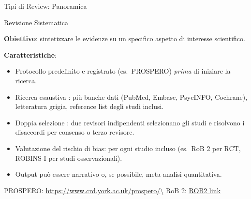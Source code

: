 \documentclass[
  ignorenonframetext,
]{beamer}
\begin{document}
\begin{frame}{Tipi di Review: Panoramica}
\label{tipi-di-review-panoramica}
\end{frame}

\begin{frame}{Revisione Sistematica}
\label{revisione-sistematica}
\small

\textbf{Obiettivo}: sintetizzare le evidenze su un specifico aspetto di
interesse scientifico.

\textbf{Caratteristiche}:

\begin{itemize}
\item
  Protocollo predefinito e registrato (es.~PROSPERO) \emph{prima} di
  iniziare la ricerca.
\item
  Ricerca esaustiva : più banche dati (PubMed, Embase, PsycINFO,
  Cochrane), letteratura grigia, reference list degli studi inclusi.
\item
  Doppia selezione : due revisori indipendenti selezionano gli studi e
  risolvono i disaccordi per consenso o terzo revisore.
\item
  Valutazione del rischio di bias: per ogni studio incluso (es.~RoB 2
  per RCT, ROBINS-I per studi osservazionali).
\item
  Output può essere narrativo o, se possibile, meta-analisi
  quantitativa.
\end{itemize}

\tiny PROSPERO:
\url{https://www.crd.york.ac.uk/prospero/}\textbackslash{} RoB 2:
\href{https://sites.google.com/site/riskofbiastool/welcome/rob-2-0-tool?authuser=0}{\underline{ROB2 link}}
\end{frame}
\end{document}
